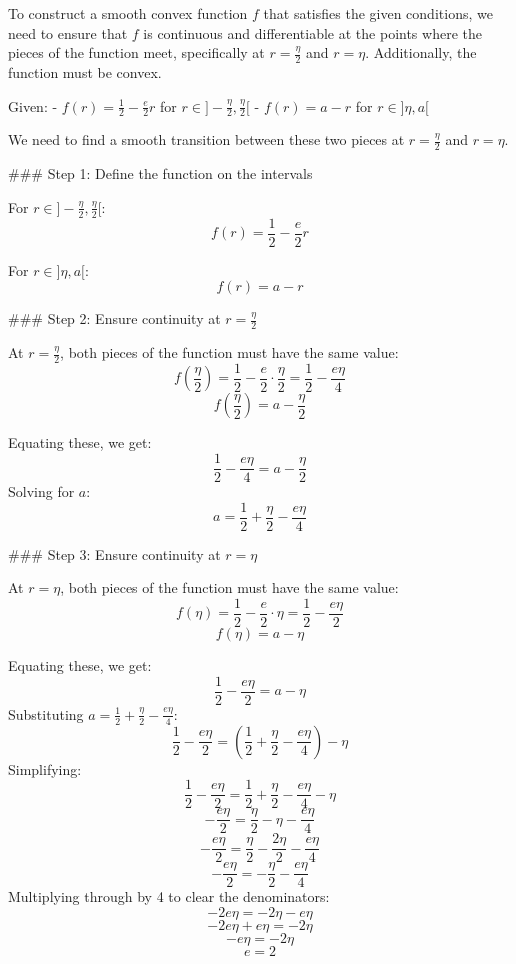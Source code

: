 To construct a smooth convex function \( f \) that satisfies the given conditions, we need to ensure that \( f \) is continuous and differentiable at the points where the pieces of the function meet, specifically at \( r = \frac{\eta}{2} \) and \( r = \eta \). Additionally, the function must be convex.

Given:
- \( f(r) = \frac{1}{2} - \frac{e}{2}r \) for \( r \in ]-\frac{\eta}{2}, \frac{\eta}{2}[\)
- \( f(r) = a - r \) for \( r \in ]\eta, a[\)

We need to find a smooth transition between these two pieces at \( r = \frac{\eta}{2} \) and \( r = \eta \).

### Step 1: Define the function on the intervals

For \( r \in ]-\frac{\eta}{2}, \frac{\eta}{2}[\):
\[ f(r) = \frac{1}{2} - \frac{e}{2}r \]

For \( r \in ]\eta, a[\):
\[ f(r) = a - r \]

### Step 2: Ensure continuity at \( r = \frac{\eta}{2} \)

At \( r = \frac{\eta}{2} \), both pieces of the function must have the same value:
\[ f\left(\frac{\eta}{2}\right) = \frac{1}{2} - \frac{e}{2} \cdot \frac{\eta}{2} = \frac{1}{2} - \frac{e\eta}{4} \]
\[ f\left(\frac{\eta}{2}\right) = a - \frac{\eta}{2} \]

Equating these, we get:
\[ \frac{1}{2} - \frac{e\eta}{4} = a - \frac{\eta}{2} \]
Solving for \( a \):
\[ a = \frac{1}{2} + \frac{\eta}{2} - \frac{e\eta}{4} \]

### Step 3: Ensure continuity at \( r = \eta \)

At \( r = \eta \), both pieces of the function must have the same value:
\[ f(\eta) = \frac{1}{2} - \frac{e}{2} \cdot \eta = \frac{1}{2} - \frac{e\eta}{2} \]
\[ f(\eta) = a - \eta \]

Equating these, we get:
\[ \frac{1}{2} - \frac{e\eta}{2} = a - \eta \]
Substituting \( a = \frac{1}{2} + \frac{\eta}{2} - \frac{e\eta}{4} \):
\[ \frac{1}{2} - \frac{e\eta}{2} = \left( \frac{1}{2} + \frac{\eta}{2} - \frac{e\eta}{4} \right) - \eta \]
Simplifying:
\[ \frac{1}{2} - \frac{e\eta}{2} = \frac{1}{2} + \frac{\eta}{2} - \frac{e\eta}{4} - \eta \]
\[ -\frac{e\eta}{2} = \frac{\eta}{2} - \eta - \frac{e\eta}{4} \]
\[ -\frac{e\eta}{2} = \frac{\eta}{2} - \frac{2\eta}{2} - \frac{e\eta}{4} \]
\[ -\frac{e\eta}{2} = -\frac{\eta}{2} - \frac{e\eta}{4} \]
Multiplying through by 4 to clear the denominators:
\[ -2e\eta = -2\eta - e\eta \]
\[ -2e\eta + e\eta = -2\eta \]
\[ -e\eta = -2\eta \]
\[ e = 2 \]

